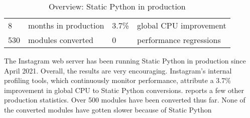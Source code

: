 \documentclass[english,cleveref,submission]{programming}
\newcommand{\SP}{Static Python}
\begin{document}







\begin{table}
  \caption{Overview: \SP{} in production}
  \label{t:prod-stat}
  \begin{tabular}{l@{~~}ll@{~~}l}
    8     & months in production & 3.7\% & global CPU improvement \\
    530   & modules converted  &  0 & performance regressions
  \end{tabular}
\end{table}

The Instagram web server has been running \SP{} in production since April 2021.
Overall, the results are very encouraging.
Instagram's internal profiling tools, which continuously monitor
performance, attribute a 3.7\% improvement in global CPU to \SP{} conversions.
 reports a few other production statistics.
Over 500 modules have been converted thus far.
None of the converted modules have gotten slower because of \SP{}
\end{document}
